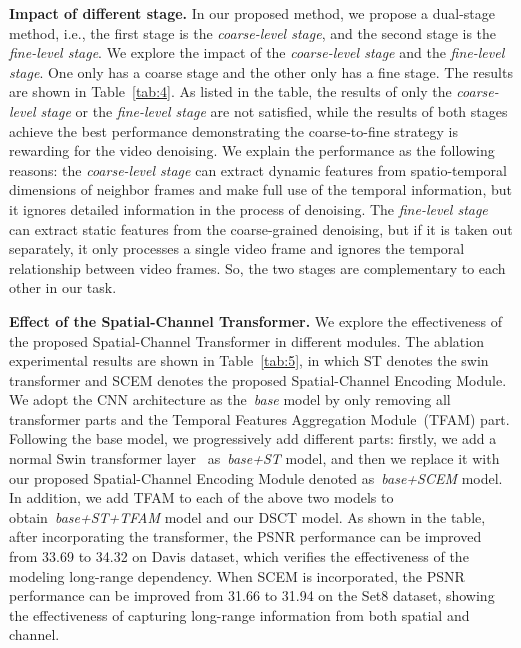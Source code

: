 \documentclass[journal]{IEEEtran}
\begin{document}
\noindent
\textbf{Impact of different stage.} 
In our proposed method, we propose a dual-stage method, i.e., the first stage is the \emph{coarse-level stage}, and the second stage is the \emph{fine-level stage}. We explore the impact of the \emph{coarse-level stage} and the \emph{fine-level stage}. One only has a coarse stage and the other only has a fine stage. The results are shown in Table~\ref{tab:4}. As listed in the table, the results of only the \emph{coarse-level stage} or the \emph{fine-level stage} are not satisfied, while the results of both stages achieve the best performance demonstrating the coarse-to-fine strategy is rewarding for the video denoising.
We explain the performance as the following reasons: the \emph{coarse-level stage} can extract dynamic features from spatio-temporal dimensions of neighbor frames and make full use of the temporal information, but it ignores detailed information in the process of denoising. The \emph{fine-level stage} can extract static features from the coarse-grained denoising, but if it is taken out separately, it only processes a single video frame and ignores the temporal relationship between video frames.
So, the two stages are complementary to each other in our task. 


\noindent
\textbf{Effect of the Spatial-Channel Transformer.} 
We explore the effectiveness of the proposed Spatial-Channel Transformer in different modules. The ablation experimental results are shown in Table~\ref{tab:5}, in which ST denotes the swin transformer and SCEM denotes the proposed Spatial-Channel Encoding Module. We adopt the CNN architecture as the~\emph{base} model by only removing all transformer parts and the Temporal Features Aggregation Module~(TFAM) part. Following the base model, we progressively add different parts: firstly, we add a normal Swin transformer layer~\cite{9710580} as~\emph{base+ST} model, and then we replace it with our proposed Spatial-Channel Encoding Module denoted as~\emph{base+SCEM} model. In addition, we add TFAM to each of the above two models to obtain~\emph{base+ST+TFAM} model and our DSCT model. As shown in the table, after incorporating the transformer, the PSNR performance can be improved from 33.69 to 34.32 on Davis dataset, which veriﬁes the effectiveness of the modeling long-range dependency. When SCEM is incorporated, the PSNR performance can be improved from 31.66 to 31.94 on the Set8 dataset, showing the effectiveness of capturing long-range information from both spatial and channel.
\end{document}
